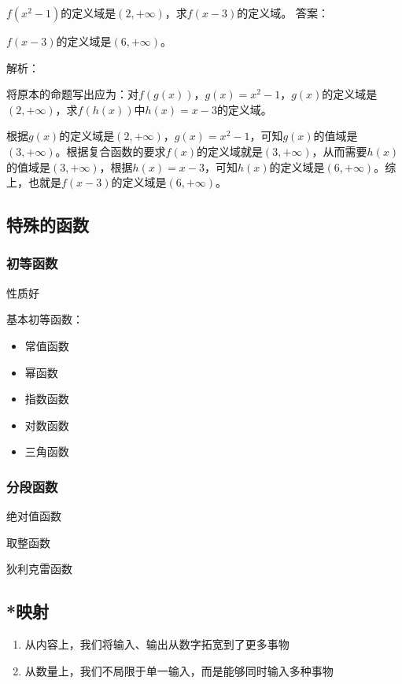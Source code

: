 \begin{exercise}{$f(x^2-1)$的定义域是$(2,+\infty)$，求$f(x-3)$的定义域。}
答案：

$f(x-3)$的定义域是$(6,+\infty)$。

解析：

将原本的命题写出应为：对$f(g(x))$，$g(x)=x^2-1$，$g(x)$的定义域是$(2,+\infty)$，求$f(h(x))$中$h(x)=x-3$的定义域。

根据$g(x)$的定义域是$(2,+\infty)$，$g(x)=x^2-1$，可知$g(x)$的值域是$(3,+\infty)$。根据复合函数的要求$f(x)$的定义域就是$(3,+\infty)$，从而需要$h(x)$的值域是$(3,+\infty)$，根据$h(x)=x-3$，可知$h(x)$的定义域是$(6,+\infty)$。综上，也就是$f(x-3)$的定义域是$(6,+\infty)$。

\end{exercise}

\subsection{特殊的函数}

\subsubsection{初等函数}

性质好

基本初等函数：
\begin{itemize}
\item 常值函数
\item 幂函数
\item 指数函数
\item 对数函数
\item 三角函数
\end{itemize}

\subsubsection{分段函数}

绝对值函数

取整函数

狄利克雷函数

\subsection{*映射}

\begin{enumerate}
\item 从内容上，我们将输入、输出从数字拓宽到了更多事物
\item 从数量上，我们不局限于单一输入，而是能够同时输入多种事物
\end{enumerate}



